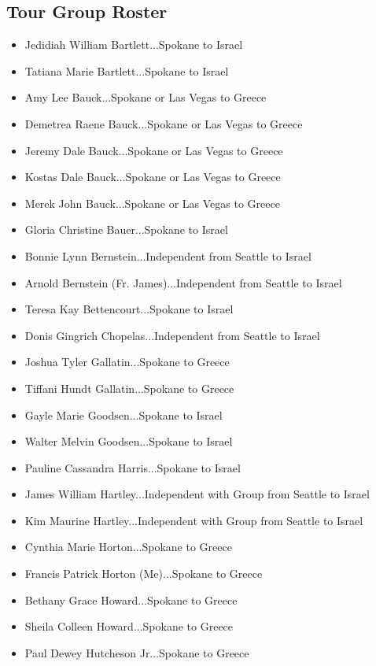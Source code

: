 \documentclass[letterpaper]{report}
\begin{document}
\begin{appendix}
	\chapter{Tour Group Roster}
	\begin{itemize}
		\item Jedidiah William Bartlett...Spokane to Israel
		\item Tatiana Marie Bartlett...Spokane to Israel
		\item Amy Lee Bauck...Spokane or Las Vegas to Greece
		\item Demetrea Raene Bauck...Spokane or Las Vegas to Greece
		\item Jeremy Dale Bauck...Spokane or Las Vegas to Greece
		\item Kostas Dale Bauck...Spokane or Las Vegas to Greece
		\item Merek John Bauck...Spokane or Las Vegas to Greece
		\item Gloria Christine Bauer...Spokane to Israel
		\item Bonnie Lynn Bernstein...Independent from Seattle to Israel
		\item Arnold Bernstein (Fr. James)...Independent from Seattle to Israel
		\item Teresa Kay Bettencourt...Spokane to Israel
		\item Donis Gingrich Chopelas...Independent from Seattle to Israel
		\item Joshua Tyler Gallatin...Spokane to Greece
		\item Tiffani Hundt Gallatin...Spokane to Greece
		\item Gayle Marie Goodsen...Spokane to Israel
		\item Walter Melvin Goodsen...Spokane to Israel
		\item Pauline Cassandra Harris...Spokane to Israel
		\item James William Hartley...Independent with Group from Seattle to Israel
		\item Kim Maurine Hartley...Independent with Group from Seattle to Israel
		\item Cynthia Marie Horton...Spokane to Greece
		\item Francis Patrick Horton (Me)...Spokane to Greece
		\item Bethany Grace Howard...Spokane to Greece
		\item Sheila Colleen Howard...Spokane to Greece
		\item Paul Dewey Hutcheson Jr...Spokane to Greece

\end{itemize}
\end{appendix}
\end{document}
